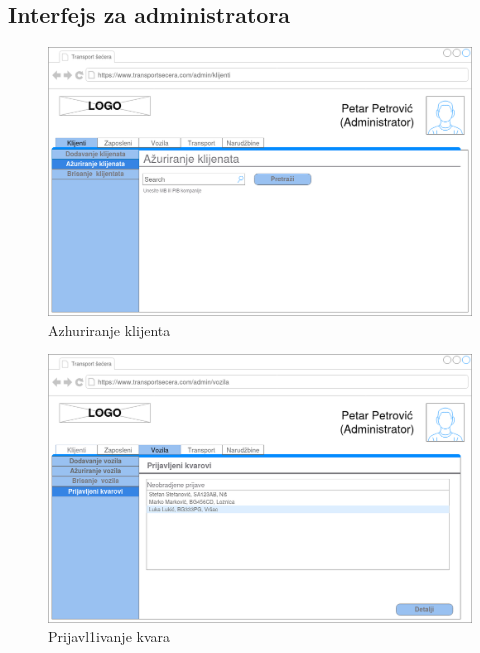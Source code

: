 \subsection{Interfejs za administratora}
\begin{figure}[H]
	\centering
	\includegraphics[scale=0.25]{Slike/KorisnickiInterfejs/Administrator/AzuriranjeKlijentaAdmin.png}
	\caption{Azhuriranje klijenta}
	\label{fig:azuriranjeklijenta}
\end{figure}
\begin{figure}[H]
	\centering
	\includegraphics[scale=0.25]{Slike/KorisnickiInterfejs/Administrator/PrijavljeniKvaroviAdmin.png}
	\caption{Prijavl1ivanje kvara}
	\label{fig:prijavakvara}
\end{figure}
